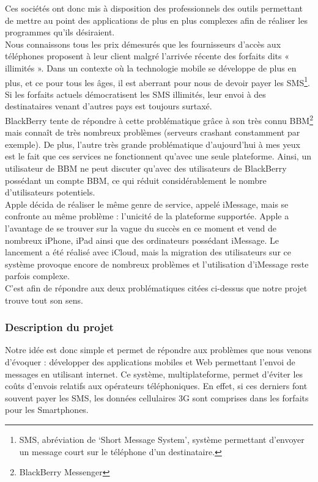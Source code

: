 \documentclass{article}
\begin{document}
	Ces sociétés ont donc mis à disposition des professionnels des outils permettant de mettre au point des applications de plus en plus complexes afin de réaliser les programmes qu'ils désiraient. \\
	
	Nous connaissons tous les prix démesurés que les fournisseurs d’accès aux téléphones proposent à leur client malgré l’arrivée récente des forfaits dits « illimités ». Dans un contexte où la technologie mobile se développe de plus en plus, et ce pour tous les âges, il est aberrant  pour nous de devoir payer les SMS\footnote{SMS, abréviation de ‘Short Message System’, système permettant d’envoyer un message court sur le téléphone d’un destinataire.}. Si les forfaits actuels démocratisent les SMS illimités, leur envoi à des destinataires venant d’autres pays est toujours surtaxé. \\
	
	BlackBerry tente de répondre à cette problématique grâce à son très connu BBM\footnote{BlackBerry Messenger} mais connaît de très nombreux problèmes (serveurs crashant constamment par exemple). De plus, l’autre très grande problématique d’aujourd’hui à mes yeux est le fait que ces services ne fonctionnent qu’avec une seule plateforme. Ainsi, un utilisateur de BBM ne peut discuter qu’avec des utilisateurs de BlackBerry possédant un compte BBM, ce qui réduit considérablement le nombre d'utilisateurs potentiels. \\
	
	Apple décida de réaliser le même genre de service, appelé iMessage, mais se confronte au même problème : l’unicité de la plateforme supportée. Apple a l'avantage de se trouver sur la vague du succès en ce moment et vend de nombreux iPhone, iPad ainsi que des ordinateurs possédant iMessage. Le lancement a été réalisé avec iCloud, mais la migration des utilisateurs sur ce système provoque encore de nombreux problèmes et l'utilisation d'iMessage reste parfois complexe.\\
	
	C’est afin de répondre aux deux problématiques citées ci-dessus que notre projet trouve tout son sens.

\subsubsection{Description du projet}
	Notre idée est donc simple et permet de répondre aux problèmes que nous venons d'évoquer : développer des applications mobiles et Web permettant l’envoi de messages en utilisant internet. Ce système, multiplateforme, permet d’éviter les coûts d’envois relatifs aux opérateurs téléphoniques. En effet, si ces derniers font souvent payer les SMS, les données cellulaires 3G sont comprises dans les forfaits pour les Smartphones.\\
	
\end{document}
